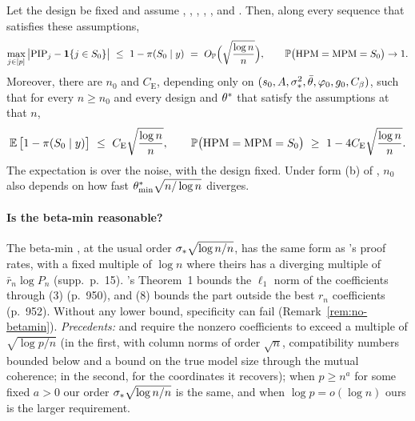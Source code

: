 \begin{theorem}\label{thm:post-fixed}
Let the design be fixed and assume , , , , ,  and . Then, along every
sequence that satisfies these assumptions,
\begin{equation}\label{eq:post-op}
  \max_{j\in\set{p}}\big|\PIP_j-\ind{j\in\Sz}\big|\ \le\ 1-\pis{\Sz}\ =\ \OP\Big(\sqrt{\frac{\log n}{n}}\Big),\qquad
  \P\big(\HPM=\MPM=\Sz\big)\to1 .
\end{equation}
Moreover, there are $n_0$ and $C_{\mathrm E}$, depending only on $(s_0,A,\sigma_*^2,\bar\theta,\varphi_0,g_0,C_\beta)$, such that for
every $n\ge n_0$ and every design and $\theta^*$ that satisfy the assumptions at that $n$,
\begin{equation}\label{eq:post-exp}
  \operatorname{\mathbb{E}}\big[1-\pi(S_0\mid y)\big]\ \le\ C_{\mathrm E}\sqrt{\frac{\log n}{n}},\qquad \mathbb{P}\big(\mathrm{HPM}=\mathrm{MPM}=S_0\big)\ \ge\ 1-4C_{\mathrm E}\sqrt{\frac{\log n}{n}} .
\end{equation}
The expectation is over the noise, with the design fixed. Under form (b) of , $n_0$ also depends on how fast
$\theta^*_{\min}\sqrt{n/\log n}$ diverges.
\end{theorem}



\paragraph{Is the beta-min reasonable?} The beta-min , at the usual order $\sigma_*\sqrt{\log n/n}$, has the same form as \SL's proof rates, with a fixed multiple of
$\log n$ where theirs has a diverging multiple of $\bar r_n\log P_n$ (supp.\ p.~15). \SL's Theorem~1 bounds the
$\ell_1$ norm of the coefficients through (3) (p.~950), and (8) bounds the part outside the best $r_n$ coefficients
(p.~952). Without any lower bound, specificity can fail
(Remark~\ref{rem:no-betamin}).
\emph{Precedents:} \citet[Theorem~5 and Corollary~1, pp.~13--14]{CastilloSchmidtHieberVanDerVaart2015} and
\citet[Theorem~1, display (8), p.~9]{YangWainwrightJordan2015} require the nonzero coefficients to exceed a multiple of
$\sqrt{\log p/n}$ (in the first, with column norms of order $\sqrt n$, compatibility numbers bounded below and a bound on
the true model size through the mutual coherence; in the second, for the coordinates it recovers); when $p\ge n^a$ for some fixed $a>0$ our order $\sigma_*\sqrt{\log n/n}$ is the same, and when $\log p=o(\log n)$ ours is the larger requirement.

